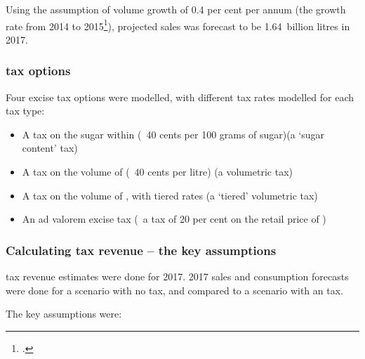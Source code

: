 \documentclass[embargoed]{grattan}
\begin{document}
Using the assumption of volume growth of 0.4 per cent per annum (the growth rate from 2014 to 2015\footcite{Media2015RetailWorldAnnual}), projected \SSB{} sales was forecast to be 1.64~billion litres in 2017.

\subsubsection{\SSB{} tax options}\label{ssb-tax-options}

Four \SSB{} excise tax options were modelled, with different tax rates modelled for each tax type:

\begin{itemize}
\item
  A tax on the sugar within \SSBs{} (\eg~40 cents per 100 grams of sugar)(a `sugar content' tax)
\item
  A tax on the volume of \SSBs{} (\eg~40 cents per litre) (a volumetric tax)
\item
  A tax on the volume of \SSBs{}, with tiered rates (a `tiered' volumetric tax)
\item
  An ad valorem excise tax (\eg~a tax of 20 per cent on the retail price of \SSBs{})
\end{itemize}

\subsubsection{Calculating \SSB{} tax revenue -- the key assumptions }\label{calculating-ssb-tax-revenue-the-key-assumptions}

\SSB{} tax revenue estimates were done for 2017. 2017 sales and consumption forecasts were done for a scenario with no \SSB{} tax, and compared to a scenario with an \SSB{} tax.

The key assumptions were:
\end{document}
